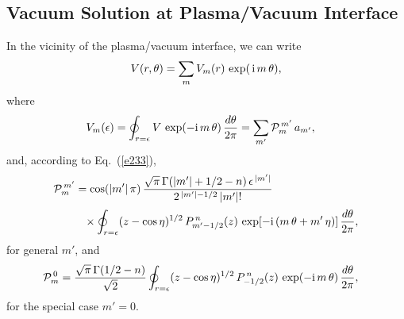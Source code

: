 \documentclass[12pt,prb,aps]{revtex4-1}
\begin{document}
\subsection{Vacuum Solution at Plasma/Vacuum Interface}\label{prdef}
In the vicinity of the plasma/vacuum interface, we can write
\begin{equation}\label{e193tt}
V(r,\theta) = \sum_m V_m(r)\,\exp(\,{\rm i}\,m\,\theta),
\end{equation}
where
\begin{align}\label{e344}
V_m (\epsilon)&= \oint_{r=\epsilon}V\,\exp(-{\rm i}\,m\,\theta)\,\frac{d\theta}{2\pi}= \sum_{m'}{\cal P}_m^{\,m'}\,a_{m'},
\end{align}
and, according to Eq.~(\ref{e233}), 
\begin{align}
{\cal P}_m^{\,m'} &=
\cos(|m'|\,\pi)\,\frac{\sqrt{\pi}\,\Gamma(|m'|+1/2-n)\,\epsilon^{\,|m'|}}{2^{\,|m'|-1/2}\,|m'|!}\nonumber\\[0.5ex]
&\phantom{=}\times
\oint_{r=\epsilon}(z-\cos\eta)^{1/2}\,P_{m'-1/2}^{\,n}(z)\,\exp[-{\rm i}\,(m\,\theta+m'\,\eta)]\,\frac{d\theta}{2\pi},\label{e346}
\end{align}
for general $m'$, and 
\begin{align}
{\cal P}_m^{\,0} &=
\frac{\sqrt{\pi}\,\Gamma(1/2-n)}{\sqrt{2}}\oint_{r=\epsilon}
(z-\cos\eta)^{1/2}\,P_{-1/2}^{\,n}(z)\,\exp(-{\rm i}\,m\,\theta)\,\frac{d\theta}{2\pi},\label{e348}
\end{align}
for the special case $m'=0$. 
\end{document}
